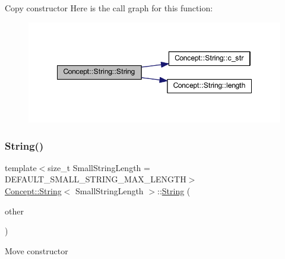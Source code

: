 Copy constructor Here is the call graph for this function\+:\nopagebreak
\begin{figure}[H]
\begin{center}
\leavevmode
\includegraphics[width=348pt]{class_concept_1_1_string_a32c7cfe0b5f891be497b6a5755709239_cgraph}
\end{center}
\end{figure}
\mbox{\label{class_concept_1_1_string_ada72510f0b4c9cbfa620c4a983f4ff35}} 
\subsubsection{\texorpdfstring{String()}{String()}\hspace{0.1cm}{\footnotesize\ttfamily [3/4]}}
{\footnotesize\ttfamily template$<$size\+\_\+t Small\+String\+Length = D\+E\+F\+A\+U\+L\+T\+\_\+\+S\+M\+A\+L\+L\+\_\+\+S\+T\+R\+I\+N\+G\+\_\+\+M\+A\+X\+\_\+\+L\+E\+N\+G\+TH$>$ \\
\mbox{\hyperlink{class_concept_1_1_string}{Concept\+::\+String}}$<$ Small\+String\+Length $>$\+::\mbox{\hyperlink{class_concept_1_1_string}{String}} (\begin{DoxyParamCaption}\item[{\mbox{\hyperlink{class_concept_1_1_string}{String}}$<$ Small\+String\+Length $>$ \&\&}]{other }\end{DoxyParamCaption})\hspace{0.3cm}{\ttfamily [inline]}}

Move constructor \mbox{\label{class_concept_1_1_string_ac70882c17fa46cac52a0bb5fad34962c}} 
